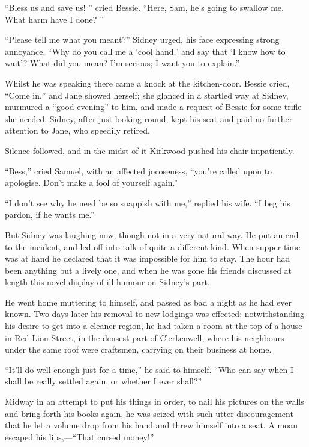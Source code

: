 ``Bless us and save us! '' cried Bessie. ``Here, Sam, he's going to
swallow me. What harm have I done? ''

``Please tell me what you meant?'' Sidney urged, his face expressing
strong annoyance. ``Why do you call me a `cool hand,' and say that `I
know how to wait'? What did you mean? I'm serious; I want you to
explain.''

Whilst he was speaking there came a knock at the kitchen-door. Bessie
cried, ``Come in,'' and Jane showed herself; she {}glanced in a startled
way at Sidney, murmured a ``good-evening'' to him, and made a request of
Bessie for some trifle she needed. Sidney, after just looking round,
kept his seat and paid no further attention to Jane, who speedily
retired.

Silence followed, and in the midst of it Kirkwood pushed his chair
impatiently.

``Bess,'' cried Samuel, with an affected jocoseness, ``you're called
upon to apologise. Don't make a fool of yourself again.''

``I don't see why he need be so snappish with me,'' replied his wife.
``I beg his pardon, if he wants me.''

But Sidney was laughing now, though not in a very natural way. He put an
end to the incident, and led off into talk of quite a different kind.
When supper-time was at hand he declared that it was impossible for him
to stay. The hour had been anything but a lively one, and when he was
gone his friends discussed at length this novel display of ill-humour on
Sidney's part.

He went home muttering to himself, and {}passed as bad a night as he had
ever known. Two days later his removal to new lodgings was effected;
notwithstanding his desire to get into a cleaner region, he had taken a
room at the top of a house in Red Lion Street, in the densest part of
Clerkenwell, where his neighbours under the same roof were craftsmen,
carrying on their business at home.

``It'll do well enough just for a time,'' he said to himself. ``Who can
say when I shall be really settled again, or whether I ever shall?''

Midway in an attempt to put his things in order, to nail his pictures on
the walls and bring forth his books again, he was seized with such utter
discouragement that he let a volume drop from his hand and threw himself
into a seat. A moan escaped his lips,---``That cursed money!''

